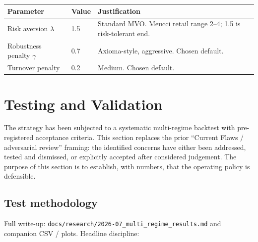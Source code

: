 \documentclass[11pt,a4paper]{article}
\begin{document}
\begin{table}[H]
\centering
\renewcommand{\arraystretch}{1.4}
\begin{tabular}{p{4cm}p{2cm}p{8cm}}
\toprule
\textbf{Parameter} & \textbf{Value} & \textbf{Justification} \\
\midrule
Risk aversion $\lambda$ & 1.5 & Standard MVO. Meucci retail range 2--4; 1.5 is risk-tolerant end. \\
Robustness penalty $\gamma$ & 0.7 & Axioma-style, aggressive. Chosen default. \\
Turnover penalty & 0.2 & Medium. Chosen default. \\
\bottomrule
\end{tabular}
\end{table}

\section{Testing and Validation}
\label{sec:testing}

The strategy has been subjected to a systematic multi-regime backtest with pre-registered acceptance criteria. This section replaces the prior ``Current Flaws / adversarial review'' framing: the identified concerns have either been addressed, tested and dismissed, or explicitly accepted after considered judgement. The purpose of this section is to establish, with numbers, that the operating policy is defensible.

\subsection{Test methodology}

Full write-up: \texttt{docs/research/2026-07\_multi\_regime\_results.md} and companion CSV / plots. Headline discipline:
\end{document}
